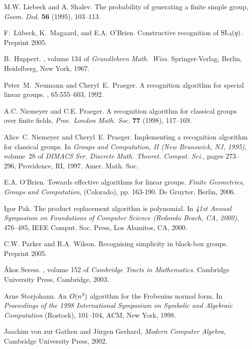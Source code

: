 \documentclass[12pt]{article}
\def\SL{{\rm SL}}
\begin{document}
\begin{thebibliography}{10}

 M.W. Liebeck and A. Shalev. The probability of generating
a finite simple group, {\it Geom. Ded.} {\bf 56} (1995), 103--113.

F.\ L{\"u}beck, K.\ Magaard, and E.A. O'Brien. 
Constructive recognition of $\SL_3(q)$.
Preprint 2005.

B.\ Huppert.
, volume 134 of {\em Grundlehren Math.\
  Wiss.}
\newblock Springer-Verlag, Berlin, Heidelberg, New York, 1967.

Peter~M.\ Neumann and Cheryl~E.\ Praeger.
\newblock A recognition algorithm for special linear groups.
, 65:555--603, 1992.

 A.C. Niemeyer and C.E. Praeger.
A recognition algorithm for classical groups over finite fields,
{\it Proc. London Math. Soc.} {\bf 77} (1998), 117--169.

Alice~C. Niemeyer and Cheryl~E. Praeger.
\newblock Implementing a recognition algorithm for classical groups.
\newblock In {\em Groups and Computation, II (New Brunswick, NJ, 1995)},
  volume~28 of {\em DIMACS Ser. Discrete Math. Theoret. Comput. Sci.}, pages
  273--296, Providence, RI, 1997. Amer. Math. Soc.

E.A. O'Brien. Towards effective algorithms for linear groups.
{\it Finite Geometries, Groups and Computation},
(Colorado), pp. 163-190. De Gruyter, Berlin, 2006.

Igor Pak. The product replacement algorithm is polynomial.
In {\it 41st Annual Symposium on Foundations of Computer Science
(Redondo Beach, CA, 2000)}, 476--485,
IEEE Comput. Soc. Press, Los Alamitos, CA, 2000.

C.W. Parker and R.A. Wilson.
Recognising simplicity in black-box groups. 
Preprint 2005.

{\'A}kos Seress.
, volume 152 of {\em Cambridge
  Tracts in Mathematics}.
\newblock Cambridge University Press, Cambridge, 2003.

Arne Storjohann.
An $O(n\sp 3)$ algorithm for the Frobenius normal form. In
{\em Proceedings of the 1998 International Symposium on Symbolic
and Algebraic Computation} (Rostock), 101--104, ACM, New York, 1998.

Joachim von zur Gathen and J\"urgen Gerhard,
{\it Modern Computer Algebra}, Cambridge University Press, 2002.
\end{thebibliography}
\end{document}
